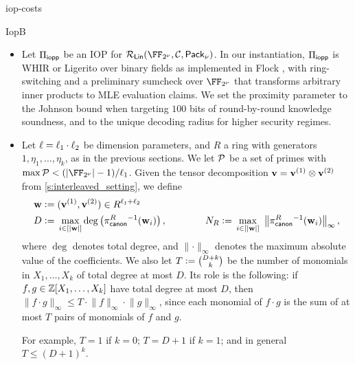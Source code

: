 \begin{lncsappendix}{iop-costs}
\begin{lncsmove}{IopB}
\begin{itemize}[leftmargin=*]
\iflncs\else\item\fi{} Let $\Pi_{\mathsf{iopp}}$ be an IOP for $\LIN(\comfield,\cC, \pack)$. In our instantiation, $\Pi_{\mathsf{iopp}}$ is  WHIR or Ligerito  \cite{whir,Ligerito} over binary fields as implemented in Flock \cite{flock}, with ring-switching \cite{binius2} and a preliminary sumcheck over $\comfield$ that transforms arbitrary inner products to MLE evaluation claims. We set the proximity parameter  to the Johnson bound when targeting $100$ bits of round-by-round knowledge soundness, and to the unique decoding radius for higher security regimes.   
\iflncs\else\item \fi
Let $\ell =\ell_1\cdot \ell_2$ be dimension parameters,  and $R$ a ring with generators $1,\eta_1,\ldots, \eta_k$,  as in the previous sections. We let $\mathcal{P}$ be a set of primes with $\max\cP< \fieldboundsizeexponent$. Given the tensor decomposition $\mathbf{v}=\mathbf{v}^{(1)}\otimes \mathbf{v}^{(2)}$ from \cref{s:interleaved_setting}, we define 
\begin{equation}\label{e:ring_theta_params}
\begin{aligned}
\mathbf{w} &{\;\vcentcolon=\;} (\mathbf{v}^{(1)},\mathbf{v}^{(2)})\in R^{\ell_1+ \ell_2}\\
D &{\;\vcentcolon=\;} \max_{i\in [|\mathbf{w}|]} \deg\left(\pi_{\mathsf{canon}}^{R}{}^{-1}(\mathbf{w}_i)\right), \qquad\qquad N_R {\;\vcentcolon=\;} \max_{i\in [|\mathbf{w}|]}\ \left\lVert \pi_{\mathsf{canon}}^{R}{}^{-1}(\mathbf{w}_i)\right\rVert_\infty,
\end{aligned}
\end{equation}
%
where $\deg$ denotes total degree, and $\lVert \cdot \rVert_\infty$ denotes the maximum absolute value of the coefficients. We also let $T{\;\vcentcolon=\;} \binom{D+k}{k}$ be the number of monomials in $X_1,\ldots, X_k$ of total degree at most $D$. Its role is the following: if $f,g\in \mathbb{Z}[X_1,\ldots,X_k]$ have total degree at most $D$, then $\lVert f\cdot g\rVert_\infty\leq T\cdot \lVert f\rVert_\infty\cdot \lVert g\rVert_\infty$, since each monomial of $f\cdot g$ is the sum of at most $T$ pairs of monomials of $f$ and $g$. 

For example, $T=1$ if $k=0$; $T= D+1$ if $k=1$; and in general $T\leq (D+1)^{k}$.  %
%


\end{itemize}
\end{lncsmove}
\end{lncsappendix}
